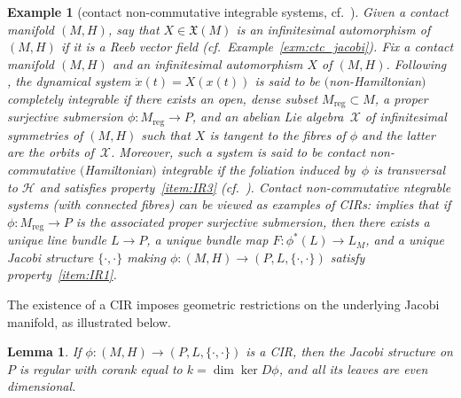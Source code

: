 \documentclass[pdftex]{sigma}
\numberwithin{equation}{section}
\newtheorem{Lemma}[Theorem]{Lemma}
\newtheorem{Example}[Theorem]{Example}
\newcommand{\X}{\ensuremath{\mathfrak{X}}}
\newcommand{\JM}{(P,L,\{\cdot,\cdot\})} %
\newcommand{\CM}{(M,H)} %
\begin{document}
\begin{Example}[contact non-commutative integrable systems, cf.\ \cite{jovanovic}]\label{sec:cont-isotr-real-2}
Given a contact manifold $\CM$, say that $X \in \X(M)$ is an {\em infinitesimal automorphism} of $\CM$ if it is a Reeb vector f\/ield (cf.\ Example~\ref{exm:ctc_jacobi}). Fix a contact manifold $\CM$ and an inf\/initesimal automorphism $X$ of $\CM$. Following \cite[Section~5.1]{jovanovic}, the dynamical system $\dot{x}(t) = X(x(t))$ is said to be {\em $($non-Hamiltonian$)$ completely integrable} if there exists an open, dense subset $M_{\mathrm{reg}} \subset M$, a proper surjective submersion $\phi\colon M_{\mathrm{reg}} \to P$, and an abelian Lie algebra~$\mathcal{X}$ of inf\/initesimal symmetries of $\CM$ such that $X$ is tangent to the f\/ibres of $\phi$ and the latter are the orbits of~$\mathcal{X}$. Moreover, such a system is said to be {\em contact non-commutative $($Hamiltonian$)$ integrable} if the foliation induced by~$\phi$ is transversal to $\mathcal{H}$ and satisf\/ies property~\ref{item:IR3} (cf.\ \cite[Def\/initions~2 and~3]{jovanovic}). Contact non-commutative ntegrable systems (with connected f\/ibres) can be viewed as examples of CIRs: \cite[Theorem~3]{jovanovic} implies that if $\phi \colon M_{\mathrm{reg}} \to P$ is the associated proper surjective submersion, then there exists a unique line bundle $L \to P$, a unique bundle map $F \colon \phi^*(L) \to L_M$, and a unique Jacobi structure $\{\cdot,\cdot\}$ making $\phi \colon \CM \to \JM$ satisfy property~\ref{item:IR1}.
\end{Example}

The existence of a CIR imposes geometric restrictions on the underlying Jacobi manifold, as illustrated below.

\begin{Lemma}\label{lemma:regular} If $\phi\colon \CM\to \JM$ is a CIR, then the Jacobi structure on $P$ is regular with corank equal to $k = \dim \ker D\phi$, and all its leaves are even dimensional.
\end{Lemma}
\end{document}
